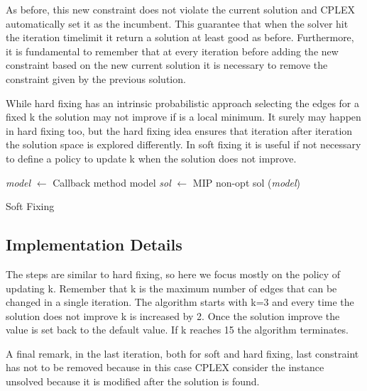 As before, this new constraint does not violate the current solution and CPLEX automatically set it as the incumbent. This guarantee that when the solver hit the iteration timelimit it return a solution at least good as before. Furthermore, it is fundamental to remember that at every iteration before adding the new constraint based on the new current solution it is necessary to remove the constraint given by the previous solution.

While hard fixing has an intrinsic probabilistic approach selecting the edges for a fixed k the solution may not improve if is a local minimum. It surely may happen in hard fixing too, but the hard fixing idea ensures that iteration after iteration the solution space is explored differently. In soft fixing it is useful if not necessary to define a policy to update k when the solution does not improve.

\begin{algorithm}[H]
\SetAlgoLined
{}
    \emph{model} $\leftarrow$ Callback method model\;
    \emph{sol} $\leftarrow$ MIP non-opt sol (\emph{model})\;
    \caption{Soft Fixing}
\end{algorithm}

\subsection{Implementation Details}
The steps are similar to hard fixing, so here we focus mostly on the policy of updating k. Remember that k is the maximum number of edges that can be changed in a single iteration. The algorithm starts with k=3 and every time the solution does not improve k is increased by 2. Once the solution improve the value is set back to the default value. If k reaches 15 the algorithm terminates.

A final remark, in the last iteration, both for soft and hard fixing, last constraint has not to be removed because in this case CPLEX consider the instance unsolved because it is modified after the solution is found.
